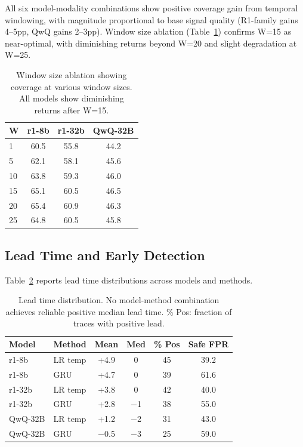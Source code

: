 \documentclass[11pt,a4paper]{article}
\begin{document}
All six model-modality combinations show positive coverage gain from temporal windowing, with magnitude proportional to base signal quality (R1-family gains 4--5pp, QwQ gains 2--3pp). Window size ablation (Table~\ref{tab:window_ablation}) confirms W=15 as near-optimal, with diminishing returns beyond W=20 and slight degradation at W=25.

\begin{table}[t]
\centering
\small
\caption{Window size ablation showing coverage at various window sizes. All models show diminishing returns after W=15.}
\label{tab:window_ablation}
\begin{tabular}{lccc}
\toprule
W & r1-8b & r1-32b & QwQ-32B \\
\midrule
1 & 60.5 & 55.8 & 44.2 \\
5 & 62.1 & 58.1 & 45.6 \\
10 & 63.8 & 59.3 & 46.0 \\
15 & 65.1 & 60.5 & 46.5 \\
20 & 65.4 & 60.9 & 46.3 \\
25 & 64.8 & 60.5 & 45.8 \\
\bottomrule
\end{tabular}
\end{table}

\subsection{Lead Time and Early Detection}

Table~\ref{tab:lead} reports lead time distributions across models and methods.

\begin{table}[t]
\centering
\small
\caption{Lead time distribution. No model-method combination achieves reliable positive median lead time. \% Pos: fraction of traces with positive lead.}
\label{tab:lead}
\begin{tabular}{llcccc}
\toprule
Model & Method & Mean & Med & \% Pos & Safe FPR \\
\midrule
r1-8b & LR temp & +4.9 & 0 & 45 & 39.2 \\
r1-8b & GRU & +4.7 & 0 & 39 & 61.6 \\
r1-32b & LR temp & +3.8 & 0 & 42 & 40.0 \\
r1-32b & GRU & +2.8 & $-$1 & 38 & 55.0 \\
QwQ-32B & LR temp & +1.2 & $-$2 & 31 & 43.0 \\
QwQ-32B & GRU & $-$0.5 & $-$3 & 25 & 59.0 \\
\bottomrule
\end{tabular}
\end{table}
\end{document}
